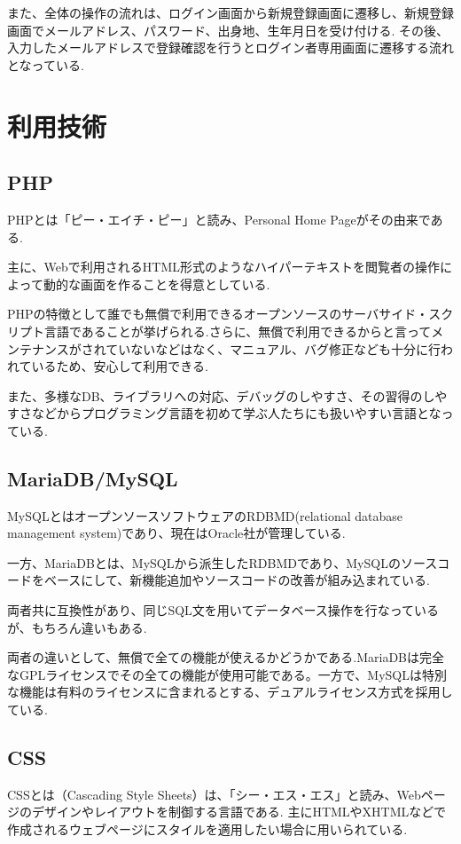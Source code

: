 \documentclass[submit,techrep]{ipsj}
\begin{document}
また、全体の操作の流れは、ログイン画面から新規登録画面に遷移し、新規登録画面でメールアドレス、パスワード、出身地、生年月日を受け付ける.  その後、入力したメールアドレスで登録確認を行うとログイン者専用画面に遷移する流れとなっている.

\section{利用技術}
\subsection{PHP}
PHPとは「ピー・エイチ・ピー」と読み、Personal Home Pageがその由来である.

主に、Webで利用されるHTML形式のようなハイパーテキストを閲覧者の操作によって動的な画面を作ることを得意としている.　

PHPの特徴として誰でも無償で利用できるオープンソースのサーバサイド・スクリプト言語であることが挙げられる.さらに、無償で利用できるからと言ってメンテナンスがされていないなどはなく、マニュアル、バグ修正なども十分に行われているため、安心して利用できる.　

また、多様なDB、ライブラリへの対応、デバッグのしやすさ、その習得のしやすさなどからプログラミング言語を初めて学ぶ人たちにも扱いやすい言語となっている.

\subsection{MariaDB/MySQL}
MySQLとはオープンソースソフトウェアのRDBMD(relational database management system)であり、現在はOracle社が管理している.

一方、MariaDBとは、MySQLから派生したRDBMDであり、MySQLのソースコードをベースにして、新機能追加やソースコードの改善が組み込まれている.

両者共に互換性があり、同じSQL文を用いてデータベース操作を行なっているが、もちろん違いもある.

両者の違いとして、無償で全ての機能が使えるかどうかである.MariaDBは完全なGPLライセンスでその全ての機能が使用可能である。一方で、MySQLは特別な機能は有料のライセンスに含まれるとする、デュアルライセンス方式を採用している.

\subsection{CSS}
CSSとは（Cascading Style Sheets）は、「シー・エス・エス」と読み、Webページのデザインやレイアウトを制御する言語である. 主にHTMLやXHTMLなどで作成されるウェブページにスタイルを適用したい場合に用いられている.
\end{document}
